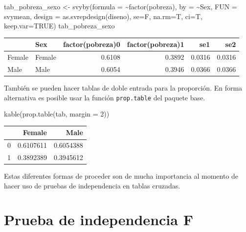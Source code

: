 \documentclass[
  12pt,
]{book}
\newenvironment{Shaded}{\begin{snugshade}}{\end{snugshade}}
\newcommand{\AttributeTok}[1]{\textcolor[rgb]{0.77,0.63,0.00}{#1}}
\newcommand{\ConstantTok}[1]{\textcolor[rgb]{0.00,0.00,0.00}{#1}}
\newcommand{\DecValTok}[1]{\textcolor[rgb]{0.00,0.00,0.81}{#1}}
\newcommand{\FunctionTok}[1]{\textcolor[rgb]{0.00,0.00,0.00}{#1}}
\newcommand{\NormalTok}[1]{#1}
\newcommand{\OtherTok}[1]{\textcolor[rgb]{0.56,0.35,0.01}{#1}}
\newcommand{\SpecialCharTok}[1]{\textcolor[rgb]{0.00,0.00,0.00}{#1}}
\begin{document}
\begin{Shaded}
\begin{Highlighting}[]
\NormalTok{tab\_pobreza\_sexo }\OtherTok{\textless{}{-}} \FunctionTok{svyby}\NormalTok{(}\AttributeTok{formula =} \SpecialCharTok{\textasciitilde{}}\FunctionTok{factor}\NormalTok{(pobreza), }
                          \AttributeTok{by =} \SpecialCharTok{\textasciitilde{}}\NormalTok{Sex,}
                          \AttributeTok{FUN =}\NormalTok{ svymean, }
                          \AttributeTok{design =} \FunctionTok{as.svrepdesign}\NormalTok{(diseno), }
                          \AttributeTok{se=}\NormalTok{F, }\AttributeTok{na.rm=}\NormalTok{T, }\AttributeTok{ci=}\NormalTok{T, }\AttributeTok{keep.var=}\ConstantTok{TRUE}\NormalTok{)}
\NormalTok{tab\_pobreza\_sexo}
\end{Highlighting}
\end{Shaded}

\begin{tabular}{l|l|r|r|r|r}
\hline
  & Sex & factor(pobreza)0 & factor(pobreza)1 & se1 & se2\\
\hline
Female & Female & 0.6108 & 0.3892 & 0.0316 & 0.0316\\
\hline
Male & Male & 0.6054 & 0.3946 & 0.0366 & 0.0366\\
\hline
\end{tabular}

También se pueden hacer tablas de doble entrada para la proporción.
En forma alternativa es posible usar la función \texttt{prop.table} del paquete base.

\begin{Shaded}
\begin{Highlighting}[]
\FunctionTok{kable}\NormalTok{(}\FunctionTok{prop.table}\NormalTok{(tab, }\AttributeTok{margin =} \DecValTok{2}\NormalTok{))}
\end{Highlighting}
\end{Shaded}

\begin{tabular}{l|r|r}
\hline
  & Female & Male\\
\hline
0 & 0.6107611 & 0.6054388\\
\hline
1 & 0.3892389 & 0.3945612\\
\hline
\end{tabular}

Estas diferentes formas de proceder son de mucha importancia al momento de hacer uso de pruebas de independencia en tablas cruzadas.

\hypertarget{prueba-de-independencia-f}{%
\section{Prueba de independencia F}\label{prueba-de-independencia-f}}
\end{document}
